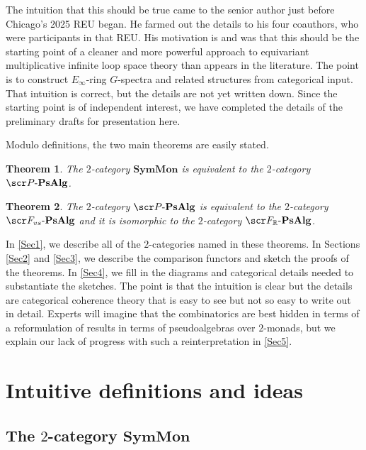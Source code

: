 \documentclass{amsart}
\newtheorem{thm}{Theorem}[section]
\theoremstyle{definition}
\numberwithin{equation}{section}
\newcommand{\PPs}{\sP\text{-}\mathbf{PsAlg}}
\newcommand{\FPs}{\sF_{vs}\text{-}\mathbf{PsAlg}}
\newcommand{\FPR}{\sF_{\bR}\text{-}\mathbf{PsAlg}}
\newcommand{\SM}{\mathbf{SymMon}}
\begin{document}
 
The intuition that this should be true came to the senior author just before Chicago's 2025 REU began. He farmed out the details to his four coauthors, who were participants in that REU.   His motivation is and was that this should be the starting point of a cleaner and more powerful approach to equivariant multiplicative infinite loop space theory than appears in the literature.  The  point is to construct $E_{\infty}$-ring $G$-spectra and related structures from categorical input.   That intuition is correct, but the details are not yet written down.   Since the starting point is of independent interest, we have completed the details of the preliminary drafts \cite{LRZZ, LRZZ2} for presentation here.

Modulo definitions, the two main theorems are easily stated.

\begin{thm}\label{thm1}  The $2$-category $\SM$  is equivalent to the $2$-category $\PPs$.
\end{thm}

\begin{thm}\label{thm2}  The $2$-category $\PPs$ is equivalent to the $2$-category $\FPs$ and it is isomorphic to the $2$-category $\FPR$. 
\end{thm}

In \autoref{Sec1}, we describe  all of the $2$-categories named in these theorems.  In Sections \ref{Sec2} and \ref{Sec3}, we describe the comparison functors and sketch the proofs of the theorems. In \autoref{Sec4}, we fill in the diagrams and categorical details needed to substantiate the sketches.   The point is that the intuition is clear but the details are categorical coherence theory that is easy to see but not so easy to write out in detail.   Experts will imagine that the combinatorics are best hidden in terms of a reformulation of results in terms of pseudoalgebras over $2$-monads, but we explain our lack of progress with such a reinterpretation in \autoref{Sec5}.

\section{Intuitive definitions and ideas}\label{Sec1}

\subsection{The $2$-category $\SM$}\label{SMC1}
\end{document}
